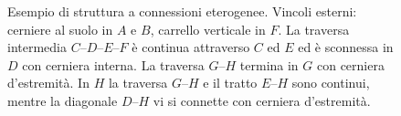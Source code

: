 \begin{figure}[ht]
		\caption{Esempio di struttura a connessioni eterogenee.
			Vincoli esterni: cerniere al suolo in $A$ e $B$,
			carrello verticale in $F$. La traversa intermedia
			$C$--$D$--$E$--$F$ è continua attraverso $C$ ed $E$
			ed è sconnessa in $D$ con cerniera interna. La
			traversa $G$--$H$ termina in $G$ con cerniera
			d'estremità. In $H$ la traversa $G$--$H$ e il tratto
			$E$--$H$ sono continui, mentre la diagonale $D$--$H$
			vi si connette con cerniera d'estremità.}
		\label{fig:struttura_mista}
	\end{figure}
